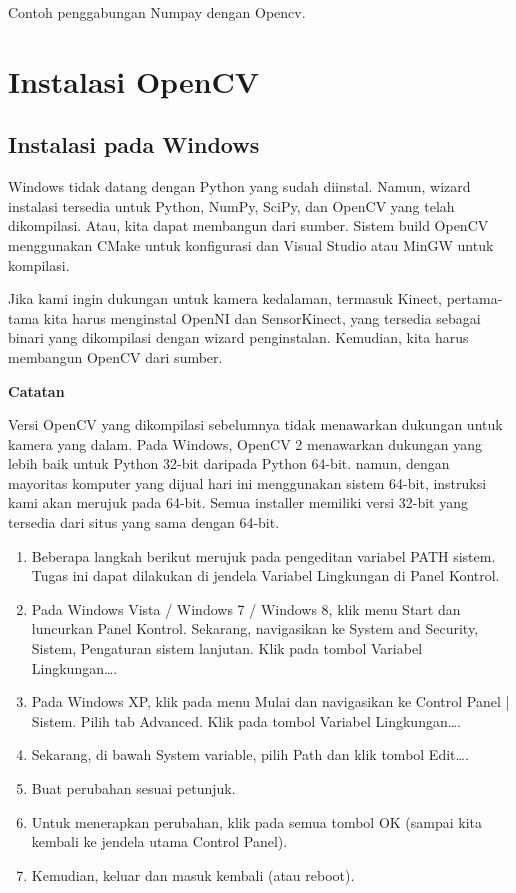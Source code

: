 Contoh penggabungan Numpay dengan Opencv.
	

\newpage
\section{Instalasi OpenCV}
\subsection{Instalasi pada Windows}

Windows tidak datang dengan Python yang sudah diinstal. Namun, wizard instalasi tersedia untuk Python, NumPy, SciPy, dan OpenCV yang telah dikompilasi. Atau, kita dapat membangun dari sumber. Sistem build OpenCV menggunakan CMake untuk konfigurasi dan Visual Studio atau MinGW untuk kompilasi.

Jika kami ingin dukungan untuk kamera kedalaman, termasuk Kinect, pertama-tama kita harus menginstal OpenNI dan SensorKinect, yang tersedia sebagai binari yang dikompilasi dengan wizard penginstalan. Kemudian, kita harus membangun OpenCV dari sumber.

\textbf{Catatan}

Versi OpenCV yang dikompilasi sebelumnya tidak menawarkan dukungan untuk kamera yang dalam. Pada Windows, OpenCV 2 menawarkan dukungan yang lebih baik untuk Python 32-bit daripada Python 64-bit. namun, dengan mayoritas komputer yang dijual hari ini menggunakan sistem 64-bit, instruksi kami akan merujuk pada 64-bit. Semua installer memiliki versi 32-bit yang tersedia dari situs yang sama dengan 64-bit.

\begin{enumerate}
	\item Beberapa langkah berikut merujuk pada pengeditan variabel PATH sistem. Tugas ini dapat dilakukan di jendela Variabel Lingkungan di Panel Kontrol.
	\item Pada Windows Vista / Windows 7 / Windows 8, klik menu Start dan luncurkan Panel Kontrol. Sekarang, navigasikan ke System and Security, Sistem, Pengaturan sistem lanjutan. Klik pada tombol Variabel Lingkungan….
	\item Pada Windows XP, klik pada menu Mulai dan navigasikan ke Control Panel | Sistem. Pilih tab Advanced. Klik pada tombol Variabel Lingkungan….
	\item Sekarang, di bawah System variable, pilih Path dan klik tombol Edit….
	\item Buat perubahan sesuai petunjuk.
	\item Untuk menerapkan perubahan, klik pada semua tombol OK (sampai kita kembali ke jendela utama Control Panel).
	\item Kemudian, keluar dan masuk kembali (atau reboot).
\end{enumerate}


